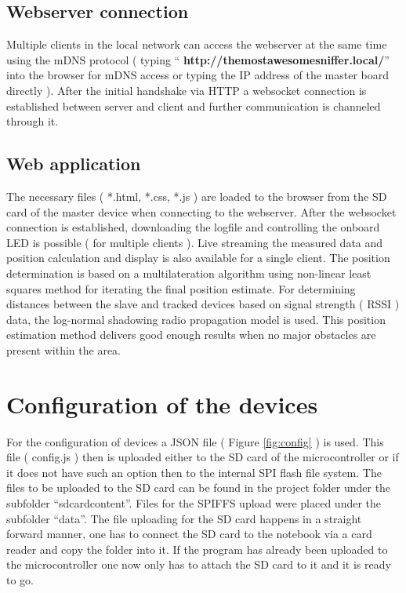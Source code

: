 \documentclass[11pt,a4paper]{article}
\numberwithin{equation}{section}   %
\numberwithin{figure}{section}     %
\numberwithin{table}{section}      %
\begin{document}
\onecolumn

\subsection{Webserver connection}
Multiple clients in the local network can access the webserver at the same time using the mDNS protocol ( typing ``{\selectfont
\textbf{http://themostawesomesniffer.local/}}'' into the browser for mDNS access or typing the IP address of the master board directly ). After the initial handshake via HTTP a websocket connection is established between server and client and further communication is channeled through it. 

\subsection{Web application}
The necessary files ( *.html, *.css, *.js ) are loaded to the browser from the SD card of the master device when connecting to the webserver. After the websocket connection is established, downloading the logfile and controlling the onboard LED is possible ( for multiple clients ). Live streaming the measured data and position calculation and display is also available for a single client. The position determination is based on a multilateration algorithm using non-linear least squares method for iterating the final position estimate. For determining distances between the slave and tracked devices based on signal strength ( RSSI ) data, the log-normal shadowing radio propagation model is used. This position estimation method delivers good enough results when no major obstacles are present within the area.



\section{Configuration of the devices}

For the configuration of devices a JSON file ( Figure \ref{fig:config} ) is used. This file ( config.js ) then is uploaded either to the SD card of the microcontroller or if it does not have such an option then to the internal SPI flash file system. The files to be uploaded to the SD card can be found in the project folder under the subfolder ``sdcardcontent''. Files for the SPIFFS upload were placed under the subfolder ``data''. The file uploading for the SD card happens in a straight forward manner, one has to connect the SD card to the notebook via a card reader and copy the folder into it. If the program has already been uploaded to the microcontroller one now only has to attach the SD card to it and it is ready to go.
\end{document}
